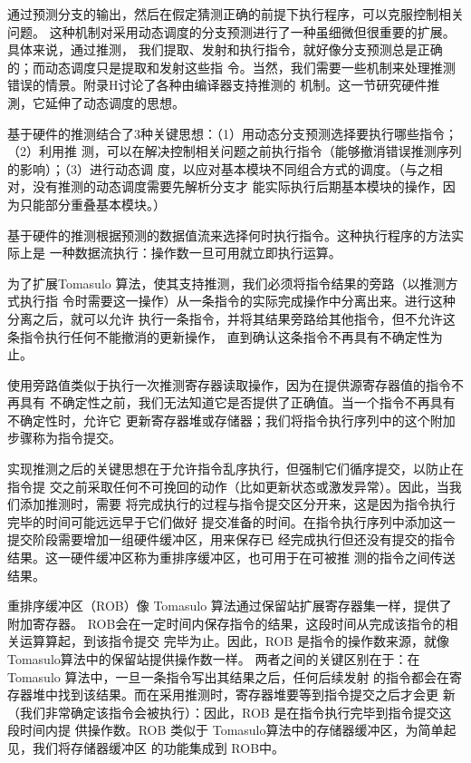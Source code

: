 通过预测分支的输出，然后在假定猜测正确的前提下执行程序，可以克服控制相关问题。
这种机制对采用动态调度的分支预测进行了一种虽细微但很重要的扩展。具体来说，通过推测，
我们提取、发射和执行指令，就好像分支预测总是正确的；而动态调度只是提取和发射这些指
令。当然，我们需要一些机制来处理推测错误的情景。附录H讨论了各种由编译器支持推测的
机制。这一节研究硬件推測，它延伸了动态调度的思想。

基于硬件的推测结合了3种关键思想：（1）用动态分支预测选择要执行哪些指令；（2）利用推
测，可以在解决控制相关问题之前执行指令（能够撤消错误推测序列的影响）；（3）进行动态调
度，以应对基本模块不同组合方式的调度。（与之相对，没有推测的动态调度需要先解析分支才
能实际执行后期基本模块的操作，因为只能部分重叠基本模块。）

基于硬件的推测根据预测的数据值流来选择何时执行指令。这种执行程序的方法实际上是
一种数据流执行：操作数一旦可用就立即执行运算。

为了扩展Tomasulo 算法，使其支持推测，我们必须将指令结果的旁路（以推测方式执行指
令时需要这一操作）从一条指令的实际完成操作中分离出来。进行这种分离之后，就可以允许
执行一条指令，并将其结果旁路给其他指令，但不允许这条指令执行任何不能撤消的更新操作，
直到确认这条指令不再具有不确定性为止。

使用旁路值类似于执行一次推测寄存器读取操作，因为在提供源寄存器值的指令不再具有
不确定性之前，我们无法知道它是否提供了正确值。当一个指令不再具有不确定性时，允许它
更新寄存器堆或存储器；我们将指令执行序列中的这个附加步骤称为指令提交。

实现推测之后的关键思想在于允许指令乱序执行，但强制它们循序提交，以防止在指令提
交之前采取任何不可挽回的动作（比如更新状态或激发异常）。因此，当我们添加推测时，需要
将完成执行的过程与指令提交区分开来，这是因为指令执行完毕的时间可能远远早于它们做好
提交准备的时间。在指令执行序列中添加这一提交阶段需要增加一组硬件缓冲区，用来保存已
经完成执行但还没有提交的指令结果。这一硬件缓冲区称为重排序缓冲区，也可用于在可被推
测的指令之间传送结果。

重排序缓冲区（ROB）像 Tomasulo 算法通过保留站扩展寄存器集一样，提供了附加寄存器。
ROB会在一定时间内保存指令的结果，这段时间从完成该指令的相关运算算起，到该指令提交
完毕为止。因此，ROB 是指令的操作数来源，就像 Tomasulo算法中的保留站提供操作数一样。
两者之间的关键区别在于：在 Tomasulo 算法中，一旦一条指令写出其结果之后，任何后续发射
的指令都会在寄存器堆中找到该结果。而在采用推测时，寄存器堆要等到指令提交之后才会更
新（我们非常确定该指令会被执行）：因此，ROB 是在指令执行完毕到指令提交这段时间内提
供操作数。ROB 类似于 Tomasulo算法中的存储器缓冲区，为简单起见，我们将存储器缓冲区
的功能集成到 ROB中。

